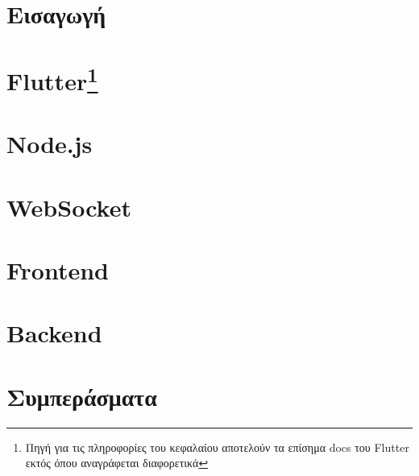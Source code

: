 \documentclass[a4paper, 11pt]{report}
\newcommand\blankpage{%
    \null
    \thispagestyle{empty}%
    \newpage
    }
\begin{document}
\tableofcontents

\afterpage{\blankpage}

\chapter{Εισαγωγή}


\afterpage{\blankpage}

\chapter[Flutter]{Flutter\footnote{Πηγή για τις πληροφορίες του κεφαλαίου αποτελούν τα επίσημα docs του Flutter \cite{flutter_architecture, flutter_inside} εκτός όπου αναγράφεται διαφορετικά}}


\afterpage{\blankpage}

\chapter{Node.js}


\afterpage{\blankpage}

\chapter{WebSocket}


\afterpage{\blankpage}

\chapter{Frontend}


\afterpage{\blankpage}

\chapter{Backend}


\afterpage{\blankpage}

\chapter{Συμπεράσματα}


\afterpage{\blankpage}

\appendix


\afterpage{\blankpage}

\printbibliography
\end{document}
